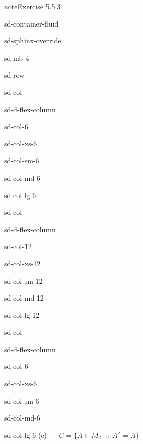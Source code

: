 \documentclass[letterpaper,10pt,english]{jupyterBook}
\begin{document}
\begin{sphinxadmonition}{note}{Exercise 5.5.3}
\begin{sphinxuseclass}{sd-container-fluid}
\begin{sphinxuseclass}{sd-sphinx-override}
\begin{sphinxuseclass}{sd-mb-4}
\begin{sphinxuseclass}{sd-row}
\begin{sphinxuseclass}{sd-col}
\begin{sphinxuseclass}{sd-d-flex-column}
\begin{sphinxuseclass}{sd-col-6}
\begin{sphinxuseclass}{sd-col-xs-6}
\begin{sphinxuseclass}{sd-col-sm-6}
\begin{sphinxuseclass}{sd-col-md-6}
\begin{sphinxuseclass}{sd-col-lg-6}
\end{sphinxuseclass}
\end{sphinxuseclass}
\end{sphinxuseclass}
\end{sphinxuseclass}
\end{sphinxuseclass}
\end{sphinxuseclass}
\end{sphinxuseclass}
\begin{sphinxuseclass}{sd-col}
\begin{sphinxuseclass}{sd-d-flex-column}
\begin{sphinxuseclass}{sd-col-12}
\begin{sphinxuseclass}{sd-col-xs-12}
\begin{sphinxuseclass}{sd-col-sm-12}
\begin{sphinxuseclass}{sd-col-md-12}
\begin{sphinxuseclass}{sd-col-lg-12}
\sphinxAtStartPar
 

\end{sphinxuseclass}
\end{sphinxuseclass}
\end{sphinxuseclass}
\end{sphinxuseclass}
\end{sphinxuseclass}
\end{sphinxuseclass}
\end{sphinxuseclass}
\begin{sphinxuseclass}{sd-col}
\begin{sphinxuseclass}{sd-d-flex-column}
\begin{sphinxuseclass}{sd-col-6}
\begin{sphinxuseclass}{sd-col-xs-6}
\begin{sphinxuseclass}{sd-col-sm-6}
\begin{sphinxuseclass}{sd-col-md-6}
\begin{sphinxuseclass}{sd-col-lg-6}
\sphinxAtStartPar
(c)   \(C = \{ A \in M_{2\times 2} : A^2 = A \}\)

\end{sphinxuseclass}
\end{sphinxuseclass}
\end{sphinxuseclass}
\end{sphinxuseclass}
\end{sphinxuseclass}
\end{sphinxuseclass}
\end{sphinxuseclass}
\end{sphinxuseclass}
\end{sphinxuseclass}
\end{sphinxuseclass}
\end{sphinxuseclass}\end{sphinxadmonition}
 \label{exercise:vector-spaces-R3-basis}
\end{document}
